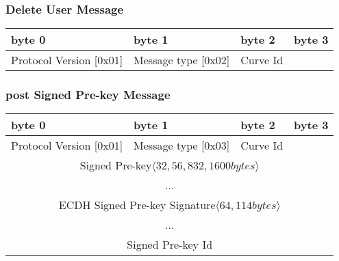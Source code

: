 \documentclass[a4paper,11pt]{article}
\begin{document}
    \subsubsection{Delete User Message}
      \begin{center}
      \begin{tabular}{ | p{1.4in} | p{1.4in} | p{1.4in} | p{1.4in} |}
        \hline
        \cellcolor[gray]{0.85} byte 0 & \cellcolor[gray]{0.85} byte 1 & \cellcolor[gray]{0.85} byte 2 & \cellcolor[gray]{0.85}byte 3\\
        \hline
        Protocol Version [0x01] & Message type [0x02] & Curve Id & \\
        \hline
      \end{tabular}
      \end{center}

    \subsubsection{post Signed Pre-key Message}
      \begin{center}
      \begin{tabular}{ | p{1.4in} | p{1.4in} | p{1.4in} | p{1.4in} |}
        \hline
        \cellcolor[gray]{0.85} byte 0 & \cellcolor[gray]{0.85} byte 1 & \cellcolor[gray]{0.85} byte 2 & \cellcolor[gray]{0.85}byte 3\\
        \hline
        Protocol Version [0x01] & Message type [0x03] & Curve Id & \\
        \cline{1-3}
        \multicolumn{4}{|c|}{Signed Pre-key$\langle 32,56,832,1600bytes\rangle $}\\
        \multicolumn{4}{|c|}{...}\\
        \hline
        \multicolumn{4}{|c|}{ECDH Signed Pre-key Signature$\langle 64,114bytes\rangle $}\\
        \multicolumn{4}{|c|}{...}\\
        \hline
        \multicolumn{4}{|c|}{Signed Pre-key Id}\\
        \hline
      \end{tabular}
      \end{center}
\end{document}
